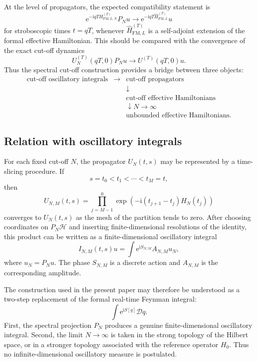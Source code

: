 \documentclass[11pt]{amsart}
\theoremstyle{plain}
\theoremstyle{definition}
\theoremstyle{remark}
\newcommand{\Hilb}{\mathcal H}
\newcommand{\ii}{\mathrm i}
\newcommand{\ee}{\mathrm e}
\begin{document}
At the level of propagators, the expected compatibility statement is
\[
        \ee^{-\ii qT H_{\mathrm{FM},L,N}^{(T)}}P_Nu
        \longrightarrow
        \ee^{-\ii qT \widehat H_{\mathrm{FM},L}^{(T)}}u
\]
for stroboscopic times \(t=qT\), whenever
\(\widehat H_{\mathrm{FM},L}^{(T)}\) is a self-adjoint extension of the
formal effective Hamiltonian.  This should be compared with the
convergence of the exact cut-off dynamics
\[
        U_N^{(T)}(qT,0)P_Nu
        \longrightarrow
        U^{(T)}(qT,0)u.
\]
Thus the spectral cut-off construction provides a bridge between three
objects:
\[
\begin{array}{ccc}
\text{cut-off oscillatory integrals}
& \longrightarrow &
\text{cut-off propagators}
\\[1mm]
&& \downarrow
\\[-1mm]
&&
\text{cut-off effective Hamiltonians}
\\[1mm]
&& \downarrow N\to\infty
\\[-1mm]
&&
\text{unbounded effective Hamiltonians}.
\end{array}
\]

\subsection{Relation with oscillatory integrals}

For each fixed cut-off \(N\), the propagator \(U_N(t,s)\) may be
represented by a time-slicing procedure.  If
\[
        s=t_0<t_1<\cdots<t_M=t,
\]
then
\[
        U_{N,M}(t,s)
        =
        \prod_{j=M-1}^{0}
        \exp\left(
        -\ii(t_{j+1}-t_j)H_N(t_j)
        \right)
\]
converges to \(U_N(t,s)\) as the mesh of the partition tends to zero.
After choosing coordinates on \(P_N\Hilb\) and inserting
finite-dimensional resolutions of the identity, this product can be
written as a finite-dimensional oscillatory integral
\[
        I_{N,M}(t,s)u
        =
        \int
        \ee^{\ii S_{N,M}}
        A_{N,M}
        u_N
        ,
\]
where \(u_N=P_Nu\).  The phase \(S_{N,M}\) is a discrete action and
\(A_{N,M}\) is the corresponding amplitude.

The construction used in the present paper may therefore be understood
as a two-step replacement of the formal real-time Feynman integral:
\[
        \int \ee^{\ii S[q]}\mathcal Dq.
\]
First, the spectral projection \(P_N\) produces a genuine
finite-dimensional oscillatory integral.  Second, the limit
\(N\to\infty\) is taken in the strong topology of the Hilbert space, or
in a stronger topology associated with the reference operator \(H_0\).
Thus no infinite-dimensional oscillatory measure is postulated.
\end{document}
